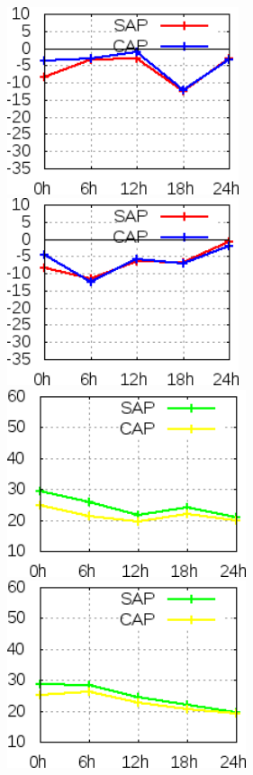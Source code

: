 \begin{figure}[!hbp]
\includegraphics[height=5.5cm]{./figs/VIES500zgeo0Z.png}\includegraphics[height=5.5cm]{./figs/VIES500zgeo12Z.png}
\includegraphics[height=5.5cm]{./figs/EQM500zgeo0Z.png}\includegraphics[height=5.5cm]{./figs/EQM500zgeo12Z.png}

\end{figure}
